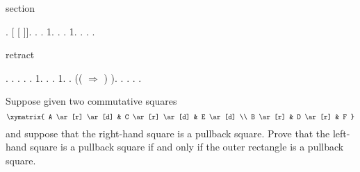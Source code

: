 \begin{coqdoccode}
\coqdocemptyline
\coqdocindent{1.00em}
\begin{coqdoccomment}
\coqdocindent{0.50em}
section\coqdocindent{0.50em}
\end{coqdoccomment}
\coqdoceol
\coqdocindent{1.00em}
 .    [ [ ]].\coqdoceol
\coqdocindent{1.00em}
 . . \coqdoctac{\ensuremath{\exists}} 1.\coqdoceol
\coqdocindent{1.00em}
 . . \coqdoctac{\ensuremath{\exists}} 1. .\coqdoceol
\coqdocindent{1.00em}
 \coqdocnotation{(} .  .\coqdoceol
\coqdocemptyline
\coqdocindent{1.00em}
\begin{coqdoccomment}
\coqdocindent{0.50em}
retract\coqdocindent{0.50em}
\end{coqdoccomment}
\coqdoceol
\coqdocindent{1.00em}
 . .\coqdoceol
\coqdocindent{1.00em}
 .  .\coqdoceol
\coqdocindent{1.00em}
 . \coqdoctac{\ensuremath{\exists}} 1. .\coqdoceol
\coqdocindent{1.00em}
 . \coqdoctac{\ensuremath{\exists}} 1. .\coqdoceol
\coqdocindent{1.00em}
 \coqdocnotation{(}   ((  \ensuremath{\Rightarrow} \coqdocnotation{(} ) ). .\coqdoceol
\coqdocindent{1.00em}
 .\coqdoceol
\coqdocnoindent
{}.\coqdoceol
\coqdocemptyline
\coqdocnoindent
{} .\coqdoceol
\coqdocemptyline
\end{coqdoccode}
Suppose given two commutative squares
\[\xymatrix{
  A \ar[r] \ar[d] & C \ar[r] \ar[d] & E \ar[d] \\
  B \ar[r] & D \ar[r] & F
}\]
and suppose that the right-hand square is a pullback square.  Prove that the
left-hand square is a pullback square if and only if the outer rectangle is a
pullback square.


